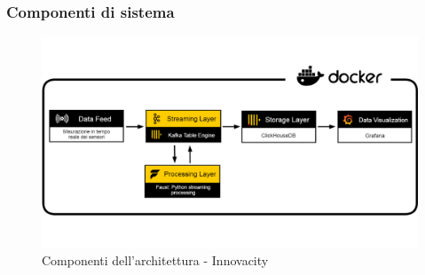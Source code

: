 \subsubsection{Componenti di sistema}
\begin{figure}[H]
    \centering
    \includegraphics[width=1\textwidth]{../Images/SpecificaTecnica/architettura.jpg}
    \caption{Componenti dell'architettura - Innovacity}
    \label{fig: fdf}
\end{figure}

